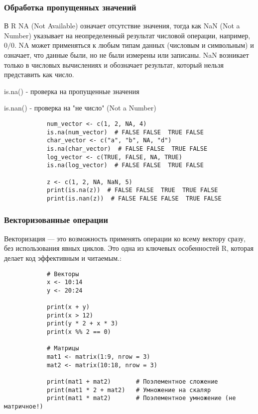 \documentclass[14pt,a4paper]{beamer}
\begin{document}
	
	\begin{frame}[fragile]
		\frametitle{Обработка пропущенных значений}
		В R NA (Not Available) означает отсутствие значения, тогда как NaN (Not a Number) указывает на неопределенный результат числовой операции, например, \(0/0\). NA может применяться к любым типам данных (числовым и символьным) и означает, что данные были, но не были измерены или записаны. NaN возникает только в числовых вычислениях и обозначает результат, который нельзя представить как число. 
		
		is.na() - проверка на пропущенные значения
		
		is.nan() - проверка на "не число" (Not a Number)
		{\fontsize{7}{7}\selectfont
		\begin{verbatim}
			num_vector <- c(1, 2, NA, 4)
			is.na(num_vector)  # FALSE FALSE  TRUE FALSE
			char_vector <- c("a", "b", NA, "d")
			is.na(char_vector)  # FALSE FALSE  TRUE FALSE
			log_vector <- c(TRUE, FALSE, NA, TRUE)
			is.na(log_vector)  # FALSE FALSE  TRUE FALSE
			
			z <- c(1, 2, NA, NaN, 5)
			print(is.na(z))  # FALSE FALSE  TRUE  TRUE FALSE
			print(is.nan(z))  # FALSE FALSE FALSE  TRUE FALSE
	    \end{verbatim}	}
	\end{frame}
	
	
	
	
	\begin{frame}[fragile]
		\frametitle{Векторизованные операции}
		Векторизация — это возможность применять операции ко всему вектору сразу, без использования явных циклов. Это одна из ключевых особенностей R, которая делает код эффективным и читаемым.:
		{\fontsize{8}{9}\selectfont
		\begin{verbatim}
			# Векторы
			x <- 10:14
			y <- 20:24
			
			print(x + y)
			print(x > 12)
			print(y * 2 + x * 3)
			print(x %% 2 == 0)
			
			# Матрицы
			mat1 <- matrix(1:9, nrow = 3)
			mat2 <- matrix(10:18, nrow = 3)
			
			print(mat1 + mat2)       # Поэлементное сложение
			print(mat1 * 2 + mat2)   # Умножение на скаляр
			print(mat1 * mat2)       # Поэлементное умножение (не матричное!)   
		\end{verbatim}
	}
	\end{frame}
	
	
\end{document}
